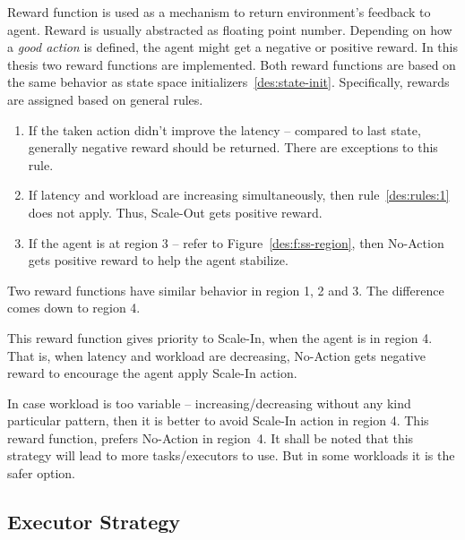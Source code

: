 Reward function is used as a mechanism to return environment's feedback to agent. Reward is usually abstracted as floating point number. Depending on how a \emph{good action} is defined, the agent might get a negative or positive reward. In this thesis two reward functions are implemented. Both reward functions are based on the same behavior as state space initializers~\ref{des:state-init}. Specifically, rewards are assigned based on general rules.
\begin{enumerate}
    \item \label{des:rules:1} If the taken action didn't improve the latency -- compared to last state, generally negative reward should be returned. There are exceptions to this rule.
    \item If latency and workload are increasing simultaneously, then rule~\ref{des:rules:1} does not apply. Thus, Scale-Out gets positive reward.
    \item If the agent is at region 3 -- refer to Figure~\ref{des:f:ss-region}, then No-Action gets positive reward to help the agent stabilize.
\end{enumerate}
Two reward functions have similar behavior in region 1, 2 and 3. The difference comes down to region 4.
\begin{description}[leftmargin=0pt]
    \item[Prefer Scale-In When Load is Decreasing] This reward function gives priority to Scale-In, when the agent is in region 4. That is, when latency and workload are decreasing, No-Action gets negative reward to encourage the agent apply Scale-In action.
    \item[Prefer No-Action When Load is Decreasing] In case workload is too variable -- increasing/decreasing without any kind particular pattern, then it is better to avoid Scale-In action in region 4. This reward function, prefers No-Action in region~4. It shall be noted that this strategy will lead to more tasks/executors to use. But in some workloads it is the safer option. 
\end{description}
\clearpage

\subsection{Executor Strategy}

